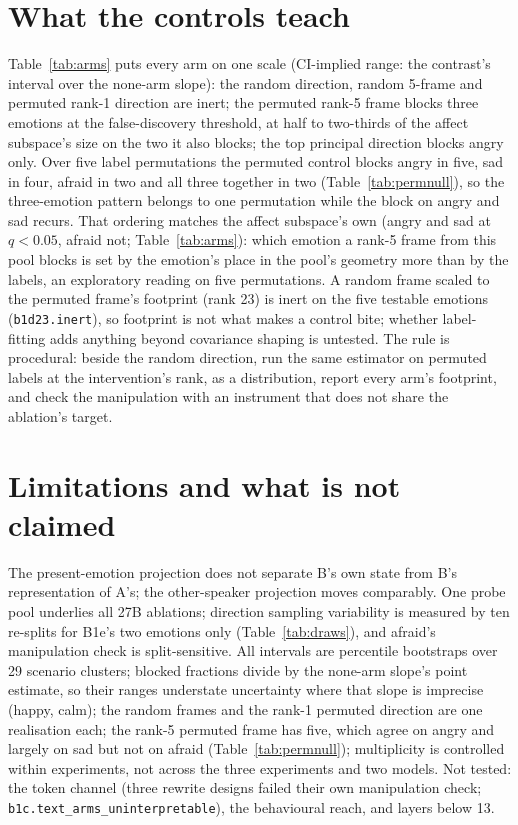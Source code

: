 \documentclass[11pt]{article}
\newcommand{\rid}[1]{{\footnotesize\texttt{#1}}}
\begin{document}
\section{What the controls teach}
\label{sec:controls}
Table~\ref{tab:arms} puts every arm on one scale (CI-implied range: the contrast's interval over the none-arm slope): the random direction, random 5-frame and permuted rank-1 direction are inert; the permuted rank-5 frame blocks three emotions at the false-discovery threshold, at half to two-thirds of the affect subspace's size on the two it also blocks; the top principal direction blocks angry only. Over five label permutations the permuted control blocks angry in five, sad in four, afraid in two and all three together in two (Table~\ref{tab:permnull}), so the three-emotion pattern belongs to one permutation while the block on angry and sad recurs. That ordering matches the affect subspace's own (angry and sad at $q<0.05$, afraid not; Table~\ref{tab:arms}): which emotion a rank-5 frame from this pool blocks is set by the emotion's place in the pool's geometry more than by the labels, an exploratory reading on five permutations. A random frame scaled to the permuted frame's footprint (rank 23) is inert on the five testable emotions (\rid{b1d23.inert}), so footprint is not what makes a control bite; whether label-fitting adds anything beyond covariance shaping is untested. The rule is procedural: beside the random direction, run the same estimator on permuted labels at the intervention's rank, as a distribution, report every arm's footprint, and check the manipulation with an instrument that does not share the ablation's target.

\section{Limitations and what is not claimed}
\enlargethispage{4\baselineskip}
\label{sec:limits}
The present-emotion projection does not separate B's own state from B's representation of A's; the other-speaker projection moves comparably. One probe pool underlies all 27B ablations; direction sampling variability is measured by ten re-splits for B1e's two emotions only (Table~\ref{tab:draws}), and afraid's manipulation check is split-sensitive. All intervals are percentile bootstraps over 29 scenario clusters; blocked fractions divide by the none-arm slope's point estimate, so their ranges understate uncertainty where that slope is imprecise (happy, calm); the random frames and the rank-1 permuted direction are one realisation each; the rank-5 permuted frame has five, which agree on angry and largely on sad but not on afraid (Table~\ref{tab:permnull}); multiplicity is controlled within experiments, not across the three experiments and two models. Not tested: the token channel (three rewrite designs failed their own manipulation check; \rid{b1c.text\_arms\_uninterpretable}), the behavioural reach, and layers below 13.
\end{document}
